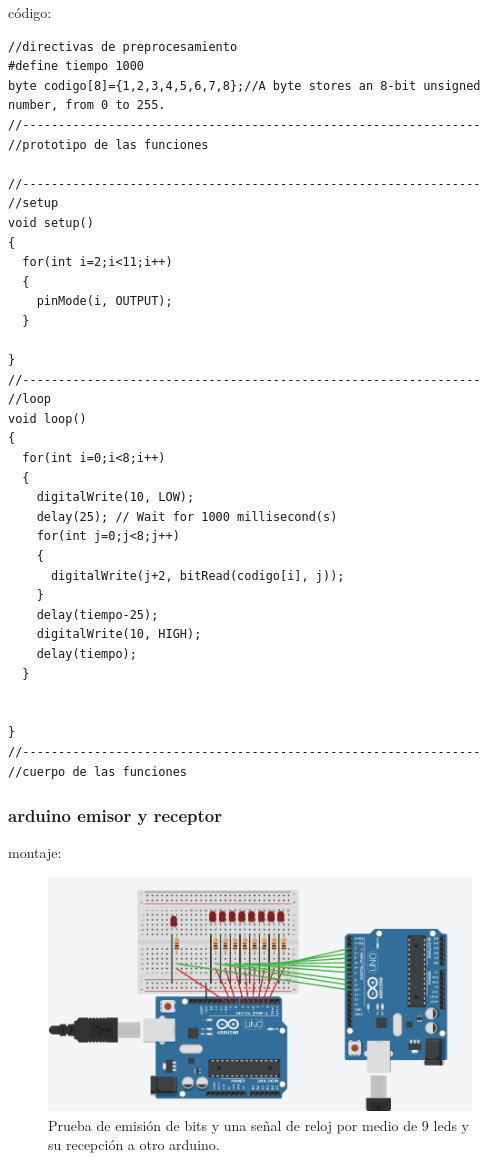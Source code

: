 \documentclass{article}
\begin{document}
código:
\begin{lstlisting}[style=myArduino]//directivas de preprocesamiento
#define tiempo 1000
byte codigo[8]={1,2,3,4,5,6,7,8};//A byte stores an 8-bit unsigned number, from 0 to 255.
//----------------------------------------------------------------
//prototipo de las funciones

//----------------------------------------------------------------
//setup
void setup()
{
  for(int i=2;i<11;i++)
  {
    pinMode(i, OUTPUT);
  }
  
}
//----------------------------------------------------------------
//loop
void loop()
{
  for(int i=0;i<8;i++)
  {
  	digitalWrite(10, LOW);
  	delay(25); // Wait for 1000 millisecond(s)
    for(int j=0;j<8;j++)
    {
      digitalWrite(j+2, bitRead(codigo[i], j));
    }
    delay(tiempo-25);
    digitalWrite(10, HIGH);
    delay(tiempo);
  }
  
  
}
//----------------------------------------------------------------
//cuerpo de las funciones
\end{lstlisting}


\newpage
\subsubsection{arduino emisor y receptor}\label{intento1}

montaje:
\begin{figure}[h]
\includegraphics[scale=0.6]{emisorReceptor1.png}
\centering
\caption{Prueba de emisión de bits y una señal de reloj por medio de 9 leds y su recepción a otro arduino.}
\label{fig:emisorReceptor1}
\end{figure}
\end{document}

